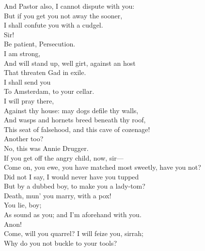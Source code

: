 \documentclass[a4paper,oneside,12pt]{memoir}
\begin{document}
\begin{drama*}
And Pastor also, I cannot dispute with you:\\
But if you get you not away the sooner,\\
I shall confute you with a cudgel.\\
\persecutionspeaks {} Sir!\\
\tribulationspeaks Be patient, Persecution.\\
\persecutionspeaks {} I am strong,\\
And will stand up, well girt, against an host\\
That threaten Gad in exile.\\
\lovewitspeaks {} I shall send you\\
To Amsterdam, to your cellar.\\
\persecutionspeaks {} I will pray there,\\
Against thy house: may dogs defile thy walls,\\
And wasps and hornets breed beneath thy roof,\\
This seat of falsehood, and this cave of cozenage!\\
\lovewitspeaks Another too?\\
\facespeaks {} No, this was Annie Drugger.\\
If you get off the angry child, now, sir---\\
\kastrilspeaks Come on, you ewe, you have matched most sweetly, have you not?\\
Did not I say, I would never have you tupped\\
But by a dubbed boy, to make you a lady-tom?\\
Death, mun' you marry, with a pox!\\
\lovewitspeaks {} You lie, boy;\\
As sound as you; and I'm aforehand with you.\\
\kastrilspeaks Anon!\\
\lovewitspeaks {} Come, will you quarrel? I will feize you, sirrah;\\
Why do you not buckle to your tools?\\

\end{drama*}
\end{document}
